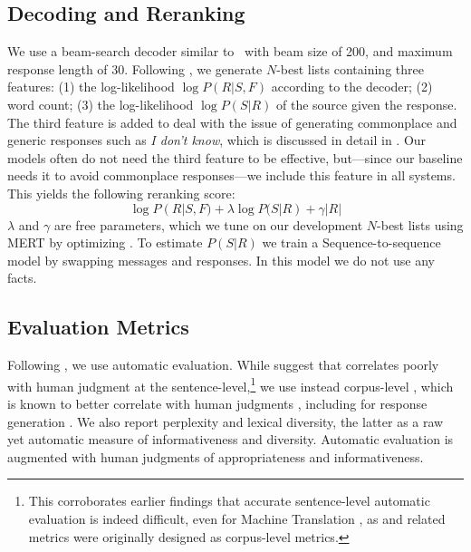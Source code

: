 \documentclass[letterpaper]{article}
\begin{document}
\subsection {Decoding and Reranking}

We use a beam-search decoder similar to~\cite{sutskever2014sequence} with beam size of 200, and maximum response length of 30. 
Following \cite{li2016diversity}, we generate $N$-best lists containing three features: (1) the log-likelihood $\log P(R|S,F)$ according to the decoder; (2) word count; (3) the log-likelihood $\log P(S|R)$ of the source given the response.
The third feature is added to deal with the issue of generating commonplace and generic responses such as {\it I don't know}, 
which is discussed in detail in \cite{li2016diversity}.
Our models often do not need the third feature to be effective, but---since our baseline needs it to avoid commonplace responses---we include this feature in all systems.
This yields the following reranking score:
\begin{equation*}
\log P(R|S,F) + \lambda \log P(S|R) + \gamma |R|
\end{equation*}
$\lambda$ and $\gamma$ are free parameters, which we tune on 
our development $N$-best lists
using MERT \cite{mert}
by optimizing \bleu. To estimate $P(S|R)$ we train a Sequence-to-sequence model  by swapping messages and responses. In this model we do not use any facts.

\subsection{Evaluation Metrics}

Following \cite{sordoni2015,li2016diversity,Wen2017Latent}, we use \bleu automatic evaluation. While \cite{notbleu:2016} suggest that \bleu correlates poorly with human judgment at the sentence-level,\footnote{This corroborates earlier findings that accurate sentence-level automatic evaluation is indeed difficult, even for Machine Translation \cite{graham-baldwin-mathur:2015:NAACL-HLT}, as \bleu and related metrics were originally designed as corpus-level metrics.} we use instead corpus-level \bleu, which is known to better correlate with human judgments \cite{MetricsMATR:2008}, including for response generation \cite{galley2015}. We also report perplexity and lexical diversity, the latter as a raw yet automatic measure of informativeness and diversity.
Automatic evaluation is augmented with human judgments of appropriateness and informativeness.
\end{document}
